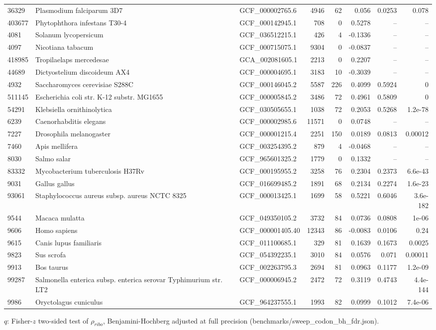 {\begin{longtable}{lp{4.3cm}lrrrrr}
36329 & Plasmodium falciparum 3D7 & GCF\_000002765.6 & 4946 & 62 & 0.056 & 0.0253 & 0.078\\
403677 & Phytophthora infestans T30-4 & GCF\_000142945.1 & 708 & 0 & 0.5278 & -- & --\\
4081 & Solanum lycopersicum & GCF\_036512215.1 & 426 & 4 & -0.1336 & -- & --\\
4097 & Nicotiana tabacum & GCF\_000715075.1 & 9304 & 0 & -0.0837 & -- & --\\
418985 & Tropilaelaps mercedesae & GCA\_002081605.1 & 2213 & 0 & 0.2207 & -- & --\\
44689 & Dictyostelium discoideum AX4 & GCF\_000004695.1 & 3183 & 10 & -0.3039 & -- & --\\
4932 & Saccharomyces cerevisiae S288C & GCF\_000146045.2 & 5587 & 226 & 0.4099 & 0.5924 & 0\\
511145 & Escherichia coli str. K-12 substr. MG1655 & GCF\_000005845.2 & 3486 & 72 & 0.4961 & 0.5809 & 0\\
54291 & Klebsiella ornithinolytica & GCF\_030505655.1 & 1038 & 72 & 0.2053 & 0.5268 & 1.2e-78\\
6239 & Caenorhabditis elegans & GCF\_000002985.6 & 11571 & 0 & 0.0748 & -- & --\\
7227 & Drosophila melanogaster & GCF\_000001215.4 & 2251 & 150 & 0.0189 & 0.0813 & 0.00012\\
7460 & Apis mellifera & GCF\_003254395.2 & 879 & 4 & -0.0468 & -- & --\\
8030 & Salmo salar & GCF\_965601325.2 & 1779 & 0 & 0.1332 & -- & --\\
83332 & Mycobacterium tuberculosis H37Rv & GCF\_000195955.2 & 3258 & 76 & 0.2304 & 0.2373 & 6.6e-43\\
9031 & Gallus gallus & GCF\_016699485.2 & 1891 & 68 & 0.2134 & 0.2274 & 1.6e-23\\
93061 & Staphylococcus aureus subsp. aureus NCTC 8325 & GCF\_000013425.1 & 1699 & 58 & 0.5221 & 0.6046 & 3.6e-182\\
9544 & Macaca mulatta & GCF\_049350105.2 & 3732 & 84 & 0.0736 & 0.0808 & 1e-06\\
9606 & Homo sapiens & GCF\_000001405.40 & 12343 & 86 & -0.0083 & 0.0106 & 0.24\\
9615 & Canis lupus familiaris & GCF\_011100685.1 & 329 & 81 & 0.1639 & 0.1673 & 0.0025\\
9823 & Sus scrofa & GCF\_054392235.1 & 3010 & 84 & 0.0576 & 0.071 & 0.00011\\
9913 & Bos taurus & GCF\_002263795.3 & 2694 & 81 & 0.0963 & 0.1177 & 1.2e-09\\
99287 & Salmonella enterica subsp. enterica serovar Typhimurium str. LT2 & GCF\_000006945.2 & 2472 & 72 & 0.3119 & 0.4743 & 4.4e-144\\
9986 & Oryctolagus cuniculus & GCF\_964237555.1 & 1993 & 82 & 0.0999 & 0.1012 & 7.4e-06\\
\hline\end{longtable}}
$q$: Fisher-$z$ two-sided test of $\rho_{ribo}$, Benjamini-Hochberg adjusted at full precision (benchmarks/sweep\_codon\_bh\_fdr.json).
